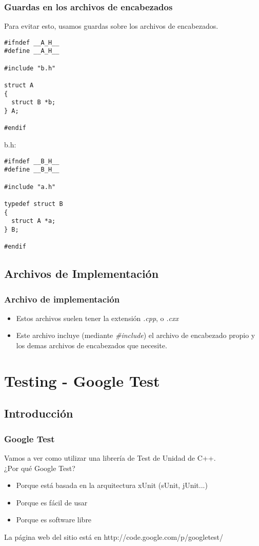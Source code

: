 \documentclass{beamer}
\begin{document}
\begin{frame}[fragile]
\frametitle{Guardas en los archivos de encabezados}
Para evitar esto, usamos guardas sobre los archivos de encabezados.

\begin{verbatim}
#ifndef __A_H__
#define __A_H__

#include "b.h"

struct A
{
  struct B *b;
} A;

#endif
\end{verbatim}

b.h:
\begin{verbatim}
#ifndef __B_H__
#define __B_H__

#include "a.h"

typedef struct B
{
  struct A *a;
} B;

#endif
\end{verbatim}


\end{frame}

\subsection{Archivos de Implementación}
\begin{frame}
 \frametitle{Archivo de implementación}
\begin{itemize}

 \item Estos archivos suelen tener la extensión \emph{.cpp}, o \emph{.cxx}
 \item Este archivo incluye (mediante \emph{\#include}) el archivo de encabezado propio y los demas archivos de encabezados que necesite.
\end{itemize}

\end{frame}

\section{Testing - Google Test}

\subsection{Introducción}
\begin{frame}
\frametitle{Google Test}
Vamos a ver como utilizar una librería de Test de Unidad de C++. \\
¿Por qué Google Test?
\begin{itemize}
 \item Porque está basada en la arquitectura xUnit (sUnit, jUnit...)
 \item Porque es fácil de usar
 \item Porque es software libre
\end{itemize}

La página web del sitio está en http://code.google.com/p/googletest/

\end{frame}
\end{document}
